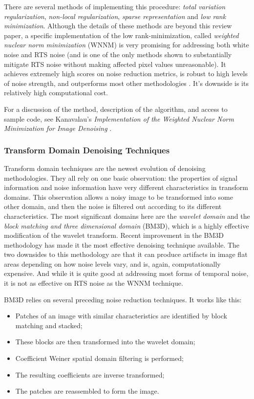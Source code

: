 \documentclass[10pt]{article}
\begin{document}
There are several methods of implementing this procedure: \emph{total variation regularization}, \emph{non-local regularization}, \emph{sparse representation} and \emph{low rank minimization}. Although the details of these methods are beyond this review paper, a specific implementation of the low rank-minimization, called \emph{weighted nuclear norm minimization} (WNNM) is very promising for addressing both white noise and RTS noise (and is one of the only methods shown to substantially mitigate RTS noise without making affected pixel values unreasonable). It achieves extremely high scores on noise reduction metrics, is robust to high levels of noise strength, and outperforms most other methodologies \cite{wu19, fan19}. It's downside is its relatively high computational cost. 

For a discussion of the method, description of the algorithm, and access to sample code, see Kanavalau's \emph{Implementation of the Weighted Nuclear Norm Minimization for Image Denoising} \cite{website:kanavalau22}.

\subsubsection{Transform Domain Denoising Techniques}

Transform domain techniques are the newest evolution of denoising methodologies. They all rely on one basic observation: the properties of signal information and noise information have very different characteristics in transform domains. This observation allows a noisy image to be transformed into some other domain, and then the noise is filtered out according to its different characteristics. The most significant domains here are the \emph{wavelet domain} and the \emph{block matching and three dimensional domain} (BM3D), which is a highly effective modification of the wavelet transform. Recent improvement in the BM3D methodology has made it the most effective denoising technique available. The two downsides to this methodology are that it can produce artifacts in image flat areas depending on how noise levels vary, and is, again, computationally expensive. And while it is quite good at addressing most forms of temporal noise, it is not as effective on RTS noise as the WNNM technique.


BM3D relies on several preceding noise reduction techniques. It works like this:

\begin{itemize}[noitemsep]
    \item Patches of an image with similar characteristics are identified by block matching and stacked;
    \item These blocks are then transformed into the wavelet domain;
    \item Coefficient Weiner spatial domain filtering is performed;
    \item The resulting coefficients are inverse transformed;
    \item The patches are reassembled to form the image.
\end{itemize}
\end{document}

